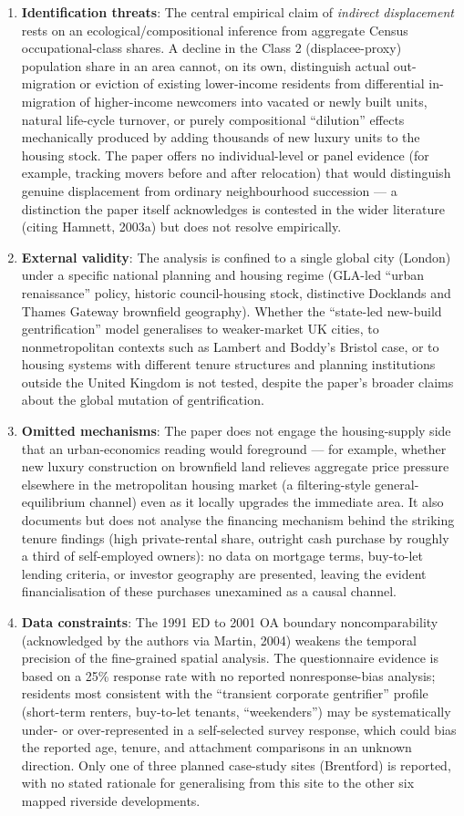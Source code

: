 \begin{enumerate}
  \item \textbf{Identification threats}: The central empirical claim of \emph{indirect displacement} rests on an ecological/compositional inference from aggregate Census occupational-class shares. A decline in the Class 2 (displacee-proxy) population share in an area cannot, on its own, distinguish actual out-migration or eviction of existing lower-income residents from differential in-migration of higher-income newcomers into vacated or newly built units, natural life-cycle turnover, or purely compositional ``dilution'' effects mechanically produced by adding thousands of new luxury units to the housing stock. The paper offers no individual-level or panel evidence (for example, tracking movers before and after relocation) that would distinguish genuine displacement from ordinary neighbourhood succession — a distinction the paper itself acknowledges is contested in the wider literature (citing Hamnett, 2003a) but does not resolve empirically.
  \item \textbf{External validity}: The analysis is confined to a single global city (London) under a specific national planning and housing regime (GLA-led ``urban renaissance'' policy, historic council-housing stock, distinctive Docklands and Thames Gateway brownfield geography). Whether the ``state-led new-build gentrification'' model generalises to weaker-market UK cities, to nonmetropolitan contexts such as Lambert and Boddy's Bristol case, or to housing systems with different tenure structures and planning institutions outside the United Kingdom is not tested, despite the paper's broader claims about the global mutation of gentrification.
  \item \textbf{Omitted mechanisms}: The paper does not engage the housing-supply side that an urban-economics reading would foreground --- for example, whether new luxury construction on brownfield land relieves aggregate price pressure elsewhere in the metropolitan housing market (a filtering-style general-equilibrium channel) even as it locally upgrades the immediate area. It also documents but does not analyse the financing mechanism behind the striking tenure findings (high private-rental share, outright cash purchase by roughly a third of self-employed owners): no data on mortgage terms, buy-to-let lending criteria, or investor geography are presented, leaving the evident financialisation of these purchases unexamined as a causal channel.
  \item \textbf{Data constraints}: The 1991 ED to 2001 OA boundary noncomparability (acknowledged by the authors via Martin, 2004) weakens the temporal precision of the fine-grained spatial analysis. The questionnaire evidence is based on a 25\% response rate with no reported nonresponse-bias analysis; residents most consistent with the ``transient corporate gentrifier'' profile (short-term renters, buy-to-let tenants, ``weekenders'') may be systematically under- or over-represented in a self-selected survey response, which could bias the reported age, tenure, and attachment comparisons in an unknown direction. Only one of three planned case-study sites (Brentford) is reported, with no stated rationale for generalising from this site to the other six mapped riverside developments.

\end{enumerate}

